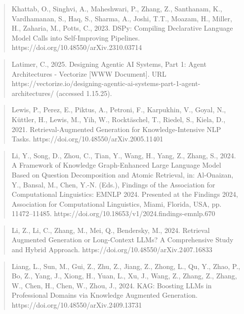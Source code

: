 \documentclass[a4paper,11pt]{report}
\begin{document}
\begin{quote}
Khattab, O., Singhvi, A., Maheshwari, P., Zhang, Z., Santhanam, K., Vardhamanan, S., Haq, S., Sharma, A., Joshi, T.T., Moazam, H., Miller, H., Zaharia, M., Potts, C., 2023. DSPy: Compiling Declarative Language Model Calls into Self-Improving Pipelines. https://doi.org/10.48550/arXiv.2310.03714
\end{quote}

\begin{quote}
Latimer, C., 2025. Designing Agentic AI Systems, Part 1: Agent Architectures - Vectorize {[}WWW Document{]}. URL https://vectorize.io/designing-agentic-ai-systems-part-1-agent-architectures/ (accessed 1.15.25).
\end{quote}

\begin{quote}
Lewis, P., Perez, E., Piktus, A., Petroni, F., Karpukhin, V., Goyal, N., Küttler, H., Lewis, M., Yih, W., Rocktäschel, T., Riedel, S., Kiela, D., 2021. Retrieval-Augmented Generation for Knowledge-Intensive NLP Tasks. https://doi.org/10.48550/arXiv.2005.11401
\end{quote}

\begin{quote}
Li, Y., Song, D., Zhou, C., Tian, Y., Wang, H., Yang, Z., Zhang, S., 2024. A Framework of Knowledge Graph-Enhanced Large Language Model Based on Question Decomposition and Atomic Retrieval, in: Al-Onaizan, Y., Bansal, M., Chen, Y.-N. (Eds.), Findings of the Association for Computational Linguistics: EMNLP 2024. Presented at the Findings 2024, Association for Computational Linguistics, Miami, Florida, USA, pp. 11472--11485. https://doi.org/10.18653/v1/2024.findings-emnlp.670
\end{quote}

\begin{quote}
Li, Z., Li, C., Zhang, M., Mei, Q., Bendersky, M., 2024. Retrieval Augmented Generation or Long-Context LLMs? A Comprehensive Study and Hybrid Approach. https://doi.org/10.48550/arXiv.2407.16833
\end{quote}

\begin{quote}
Liang, L., Sun, M., Gui, Z., Zhu, Z., Jiang, Z., Zhong, L., Qu, Y., Zhao, P., Bo, Z., Yang, J., Xiong, H., Yuan, L., Xu, J., Wang, Z., Zhang, Z., Zhang, W., Chen, H., Chen, W., Zhou, J., 2024. KAG: Boosting LLMs in Professional Domains via Knowledge Augmented Generation. https://doi.org/10.48550/arXiv.2409.13731
\end{quote}
\end{document}
